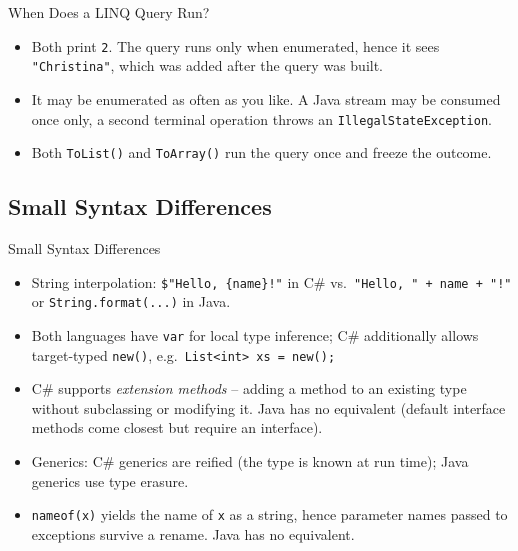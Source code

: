 \begin{solutionframe}{When Does a LINQ Query Run?}
  \begin{itemize}
    \item Both print \texttt{2}. The query runs only when enumerated, hence it
      sees \texttt{"Christina"}, which was added after the query was built.
    \item It may be enumerated as often as you like. A Java stream may be
      consumed once only, a second terminal operation throws an
      \texttt{IllegalStateException}.
    \item Both \texttt{ToList()} and \texttt{ToArray()} run the query once and
      freeze the outcome.
  \end{itemize}
  \vspace{5ex}

\end{solutionframe}

\subsection{Small Syntax Differences}

\begin{frame}[fragile]{Small Syntax Differences}
  \begin{itemize}
    \item String interpolation: \texttt{\$"Hello, \{name\}!"} in C\#
      vs.\ \texttt{"Hello, " + name + "!"} or \texttt{String.format(...)}
      in Java.
    \item Both languages have \texttt{var} for local type inference; C\#
      additionally allows target-typed \texttt{new()}, e.g.\
      \texttt{List<int> xs = new();}
    \item C\# supports \emph{extension methods} -- adding a method to an
      existing type without subclassing or modifying it. Java has no
      equivalent (default interface methods come closest but require an
      interface).
    \item Generics: C\# generics are reified (the type is known at run
      time); Java generics use type erasure.
    \item \texttt{nameof(x)} yields the name of \texttt{x} as a string, hence
      parameter names passed to exceptions survive a rename. Java has no
      equivalent.
  \end{itemize}
  \vfill


\end{frame}

